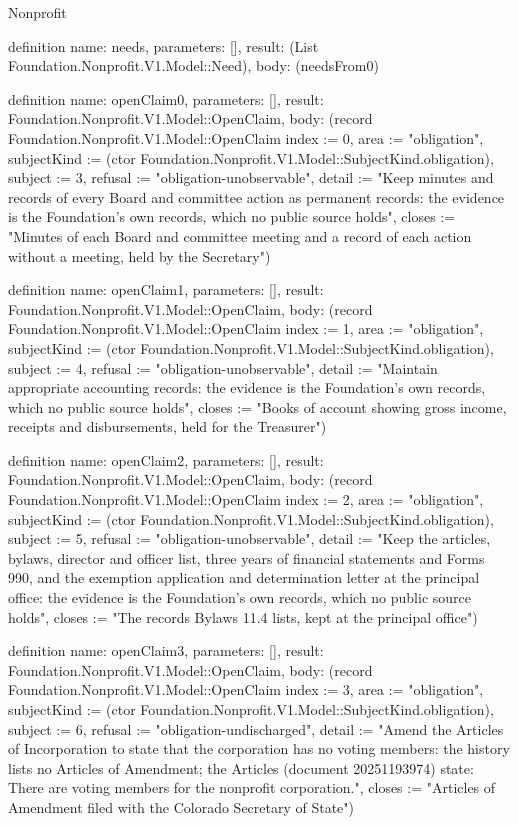\begin{lexlean}{Nonprofit}
\begin{semanticmodule}
definition{
  name: needs,
  parameters: [],
  result: (List Foundation.Nonprofit.V1.Model::Need),
  body: (needsFrom0)
}

definition{
  name: openClaim0,
  parameters: [],
  result: Foundation.Nonprofit.V1.Model::OpenClaim,
  body: (record Foundation.Nonprofit.V1.Model::OpenClaim {index := 0, area := "obligation", subjectKind := (ctor Foundation.Nonprofit.V1.Model::SubjectKind.obligation), subject := 3, refusal := "obligation-unobservable", detail := "Keep minutes and records of every Board and committee action as permanent records: the evidence is the Foundation’s own records, which no public source holds", closes := "Minutes of each Board and committee meeting and a record of each action without a meeting, held by the Secretary"})
}

definition{
  name: openClaim1,
  parameters: [],
  result: Foundation.Nonprofit.V1.Model::OpenClaim,
  body: (record Foundation.Nonprofit.V1.Model::OpenClaim {index := 1, area := "obligation", subjectKind := (ctor Foundation.Nonprofit.V1.Model::SubjectKind.obligation), subject := 4, refusal := "obligation-unobservable", detail := "Maintain appropriate accounting records: the evidence is the Foundation’s own records, which no public source holds", closes := "Books of account showing gross income, receipts and disbursements, held for the Treasurer"})
}

definition{
  name: openClaim2,
  parameters: [],
  result: Foundation.Nonprofit.V1.Model::OpenClaim,
  body: (record Foundation.Nonprofit.V1.Model::OpenClaim {index := 2, area := "obligation", subjectKind := (ctor Foundation.Nonprofit.V1.Model::SubjectKind.obligation), subject := 5, refusal := "obligation-unobservable", detail := "Keep the articles, bylaws, director and officer list, three years of financial statements and Forms 990, and the exemption application and determination letter at the principal office: the evidence is the Foundation’s own records, which no public source holds", closes := "The records Bylaws 11.4 lists, kept at the principal office"})
}

definition{
  name: openClaim3,
  parameters: [],
  result: Foundation.Nonprofit.V1.Model::OpenClaim,
  body: (record Foundation.Nonprofit.V1.Model::OpenClaim {index := 3, area := "obligation", subjectKind := (ctor Foundation.Nonprofit.V1.Model::SubjectKind.obligation), subject := 6, refusal := "obligation-undischarged", detail := "Amend the Articles of Incorporation to state that the corporation has no voting members: the history lists no Articles of Amendment; the Articles (document 20251193974) state: There are voting members for the nonprofit corporation.", closes := "Articles of Amendment filed with the Colorado Secretary of State"})
}


\end{semanticmodule}
\end{lexlean}

